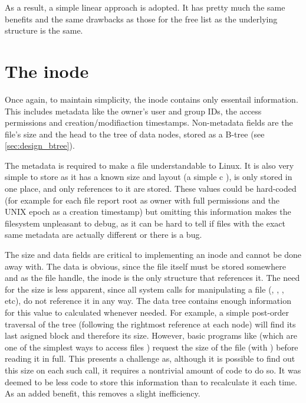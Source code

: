         As a result, a simple linear approach is adopted. It has pretty much
        the same benefits and the same drawbacks as those for the free list as
        the underlying structure is the same.

    \section{The inode}

        Once again, to maintain simplicity, the inode contains only essentail
        information. This includes metadata like the owner's user and group
        IDs, the access permissions and creation/modifiaction timestamps.
        Non-metadata fields are the file's size and the head to the tree of
        data nodes, stored as a B-tree (see \autoref{sec:design_btree}).

        The metadata is required to make a file understandable to Linux. It is
        also very simple to store as it has a known size and layout (a simple c
        ), is only stored in one place, and only references
        to it are stored. These values could be hard-coded (for example for
        each file report root as owner with full permissions and the UNIX epoch
        as a creation timestamp) but omitting this information makes the
        filesystem unpleasant to debug, as it can be hard to tell if files with
        the exact same metadata are actually different or there is a bug.

        The size and data fields are critical to implementing an inode and
        cannot be done away with. The data is obvious, since the file itself
        must be stored somewhere and as the file handle, the inode is the only
        structure that references it. The need for the size is less apparent,
        since all system calls for manipulating a file (,
        , ,  etc), do not reference
        it in any way. The data tree contains enough information for this value
        to calculated whenever needed. For example, a simple post-order
        traversal of the tree (following the rightmost reference at each node)
        will find its last asigned block and therefore its size. However, basic
        programs like  (which are one of the simplest ways to
        access files \cite{TLDP_proc_access}) request the size of the file
        (with ) before reading it in full. This presents a
        challenge as, although it is possible to find out this size on each
        such call, it requires a nontrivial amount of code to do so. It was
        deemed to be less code to store this information than to recalculate it
        each time. As an added benefit, this removes a slight inefficiency.

